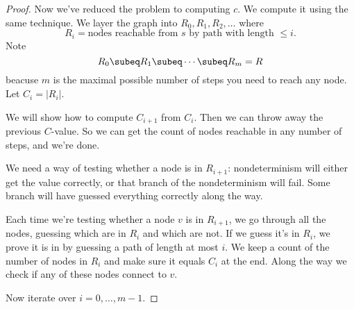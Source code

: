 \begin{proof}
Now we've reduced the problem to computing $c$. We compute it using the same technique. We layer the graph into $R_0,R_1,R_2,\ldots$ where 
\[
R_i=\text{nodes reachable from $s$ by path with length $\le i$}.
\]
Note
\[
R_0\subeq R_1\subeq \cdots \subeq R_m=R
\]
beacuse $m$ is the maximal possible number of steps you need to reach any node. Let $C_i=|R_i|$.


We will show how to compute $C_{i+1}$ from $C_i$. Then we can throw away the previous $C$-value. So we can get the count of nodes reachable in any number of steps, and we're done.

We need a way of testing whether a node is in $R_{i+1}$: nondeterminism will either get the value correctly, or that branch of the nondeterminism will fail. Some branch will have guessed everything correctly along the way.

Each time we're testing whether a node $v$ is in $R_{i+1}$, we go through all the nodes, guessing which are in $R_i$ and which are not. If we guess it's in $R_i$, we prove it is in by guessing a path of length at most $i$. We keep a count of the number of nodes in $R_i$ and make sure it equals $C_i$ at the end. Along the way we check if any of these nodes connect to $v$.

Now iterate over $i=0,\ldots, m-1$. 
\end{proof}
